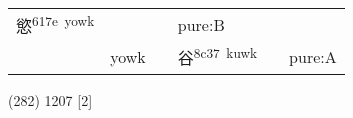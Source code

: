 \documentclass[14pt,a4paper]{scrartcl}
\begin{document}
\begin{longtable}[c]{@{}llllll@{}}
\begin{minipage}[t]{0.14\columnwidth}\raggedright\strut
慾\textsuperscript{617e~yowk}
\strut\end{minipage} &
\begin{minipage}[t]{0.14\columnwidth}\raggedright\strut
\strut\end{minipage} &
\begin{minipage}[t]{0.14\columnwidth}\raggedright\strut
\strut\end{minipage} &
\begin{minipage}[t]{0.14\columnwidth}\raggedright\strut
pure:B
\strut\end{minipage}\tabularnewline
\begin{minipage}[t]{0.14\columnwidth}\raggedright\strut
𠔌
\strut\end{minipage} &
\begin{minipage}[t]{0.14\columnwidth}\raggedright\strut
yowk
\strut\end{minipage} &
\begin{minipage}[t]{0.14\columnwidth}\raggedright\strut
\strut\end{minipage} &
\begin{minipage}[t]{0.14\columnwidth}\raggedright\strut
谷\textsuperscript{8c37~kuwk}
\strut\end{minipage} &
\begin{minipage}[t]{0.14\columnwidth}\raggedright\strut
\strut\end{minipage} &
\begin{minipage}[t]{0.14\columnwidth}\raggedright\strut
pure:A
\strut\end{minipage}\tabularnewline
\bottomrule
\end{longtable}

(282) 1207 {[}2{]}
\end{document}
